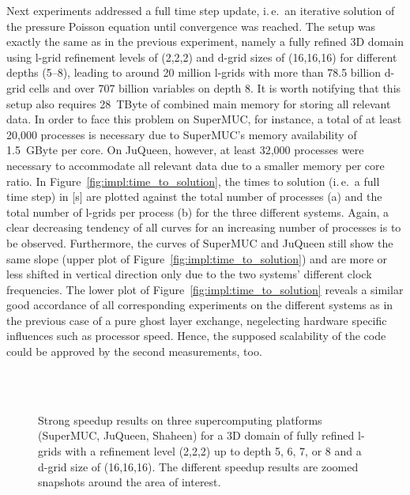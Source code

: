 \documentclass[10pt, conference, compsocconf]{IEEEtran}
\begin{document}
Next experiments addressed a full time step update, i.\,e.\ an iterative solution of the pressure Poisson equation until convergence was reached. The setup was exactly the same as in the previous experiment, namely a fully refined 3D domain using l-grid refinement levels of (2,2,2) and d-grid sizes of (16,16,16) for different depths (5--8), leading to around 20 million l-grids with more than 78.5 billion d-grid cells and over 707 billion variables on depth 8. It is worth notifying that this setup also requires 28~TByte of combined main memory for storing all relevant data. In order to face this problem on SuperMUC, for instance, a total of at least 20,000 processes is necessary due to SuperMUC's memory availability of 1.5~GByte per core. On JuQueen, however, at least 32,000 processes were necessary to accommodate all relevant data due to a smaller memory per core ratio. In Figure~\ref{fig:impl:time_to_solution}, the times to solution (i.\,e.\ a full time step) in [s] are plotted against the total number of processes (a) and the total  number of l-grids per process (b) for the three different systems. Again, a clear decreasing tendency of all curves for an increasing number of processes is to be observed. Furthermore, the curves of SuperMUC and JuQueen still show the same slope (upper plot of Figure~\ref{fig:impl:time_to_solution}) and are more or less shifted in vertical direction only due to the two systems' different clock frequencies. The lower plot of Figure~\ref{fig:impl:time_to_solution} reveals a similar good accordance of all corresponding experiments on the different systems as in the previous case of a pure ghost layer exchange, negelecting hardware specific influences such as processor speed. Hence, the supposed scalability of the code could be approved by the second measurements, too.

\begin{figure}[!htbp]
	\centering
	 \\
	 \\
	\caption{Strong speedup results on three supercomputing platforms (SuperMUC, JuQueen, Shaheen) for a 3D domain of fully refined l-grids with a refinement level (2,2,2) up to depth 5, 6, 7, or 8 and a d-grid size of (16,16,16). The different speedup results are zoomed snapshots around the area of interest.}
	\label{fig:impl:speedup1}
\end{figure}
\end{document}
